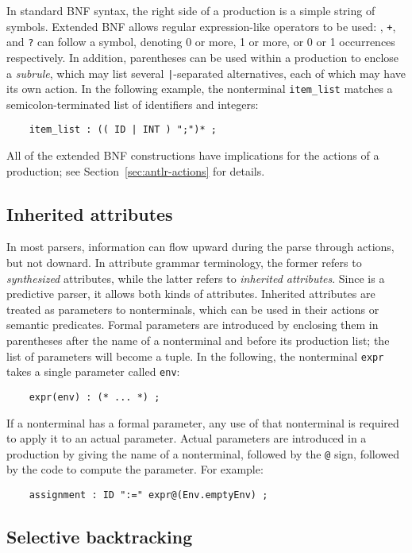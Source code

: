 In standard BNF syntax, the right side of a production is a simple string of symbols.  Extended BNF allows regular expression-like operators to be used: {\tt *}, {\tt +}, and {\tt ?} can follow a symbol, denoting 0 or more, 1 or more, or 0 or 1 occurrences respectively.  In addition, parentheses can be used within a production to enclose a \emph{subrule}, which may list several {\tt |}-separated alternatives, each of which may have its own action.  In the following example, the nonterminal {\tt item\_list} matches a semicolon-terminated list of identifiers and integers:
\begin{verbatim}
    item_list : (( ID | INT ) ";")* ;
\end{verbatim}
All of the extended BNF constructions have implications for the actions of a production; see Section~\ref{sec:antlr-actions} for details.

\subsection{Inherited attributes}\label{sec:inh-attr}

In most parsers, information can flow upward during the parse through actions, but not downard.  In attribute grammar terminology, the former refers to \emph{synthesized} attributes, while the latter refers to \emph{inherited attributes}.  Since \antlr{} is a predictive parser, it allows both kinds of attributes.  Inherited attributes are treated as parameters to nonterminals, which can be used in their actions or semantic predicates.  Formal parameters are introduced by enclosing them in parentheses after the name of a nonterminal and before its production list; the list of parameters will become a tuple.  In the following, the nonterminal {\tt expr} takes a single parameter called {\tt env}:
\begin{verbatim}
    expr(env) : (* ... *) ;
\end{verbatim}
If a nonterminal has a formal parameter, any use of that nonterminal is required to apply it to an actual parameter.  Actual parameters are introduced in a production by giving the name of a nonterminal, followed by the {\tt @} sign, followed by the code to compute the parameter.  For example:
\begin{verbatim}
    assignment : ID ":=" expr@(Env.emptyEnv) ;
\end{verbatim}

\subsection{Selective backtracking}


